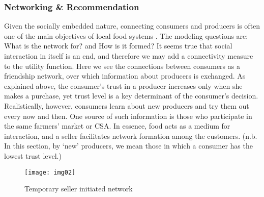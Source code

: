 \documentclass[11pt, oneside]{article}
\begin{document}
\subsubsection{Networking \& Recommendation}
Given the socially embedded nature, connecting consumers and producers is often one of the main objectives of local food systems \parencite{Martinez2010}. The modeling questions are: What is the network for? and How is it formed? It seems true that social interaction in itself is an end, and therefore we may add a connectivity measure to the utility function. Here we see the connections between consumers as a friendship network, over which information about producers is exchanged. As explained above, the consumer's trust in a producer increases only when she makes a purchase, yet trust level is a key determinant of the consumer's decision. Realistically, however, consumers learn about new producers and try them out every now and then. One source of such information is those who participate in the same farmers' market or CSA. In essence, food acts as a medium for interaction, and a seller facilitates network formation among the customers. (n.b. In this section, by `new' producers, we mean those in which a consumer has the lowest trust level.)
\begin{figure}[h]
\centering
  \texttt{[image: img02]}
  \caption{Temporary seller initiated network}
\end{figure}
\end{document}
